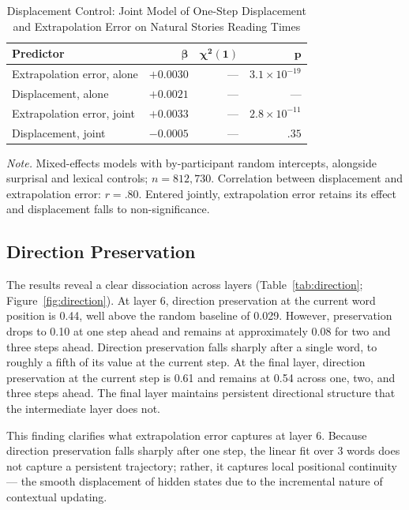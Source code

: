 \documentclass[12pt]{article}
\newcommand{\new}[1]{#1}   %
\begin{document}
\begin{table}[!htbp]
\centering
\caption{Displacement Control: Joint Model of One-Step Displacement and Extrapolation Error on Natural Stories Reading Times}
\label{tab:displacement}
\begin{tabular}{lrrr}
\toprule
\textbf{Predictor} & $\boldsymbol{\beta}$ & $\boldsymbol{\chi^2(1)}$ & $\boldsymbol{p}$ \\
\midrule
\new{Extrapolation error, alone} & \new{$+0.0030$} & \new{---} & \new{$3.1 \times 10^{-19}$} \\
\new{Displacement, alone} & \new{$+0.0021$} & \new{---} & \new{---} \\
\new{Extrapolation error, joint} & \new{$+0.0033$} & \new{---} & \new{$2.8 \times 10^{-11}$} \\
\new{Displacement, joint} & \new{$-0.0005$} & \new{---} & \new{$.35$} \\
\bottomrule
\end{tabular}

\smallskip
\footnotesize
\textit{Note.} \new{Mixed-effects models with by-participant random intercepts, alongside surprisal and lexical controls; $n = 812{,}730$. Correlation between displacement and extrapolation error: $r = .80$. Entered jointly, extrapolation error retains its effect and displacement falls to non-significance.}
\end{table}

\subsection{Direction Preservation}\label{sec:direction}

The results reveal a clear dissociation across layers (Table~\ref{tab:direction}; Figure~\ref{fig:direction}). At layer 6, direction preservation at the current word position is 0.44, well above the random baseline of 0.029. However, preservation drops to 0.10 at one step ahead and remains at approximately 0.08 for two and three steps ahead. \new{Direction preservation falls sharply after a single word, to roughly a fifth of its value at the current step.} At the final layer, direction preservation at the current step is 0.61 and remains at 0.54 across one, two, and three steps ahead. The final layer maintains persistent directional structure that the intermediate layer does not.

This finding clarifies what extrapolation error captures at layer 6. \new{Because direction preservation falls sharply after one step}, the linear fit over 3 words does not capture a persistent trajectory; rather, it captures local positional continuity --- the smooth displacement of hidden states due to the incremental nature of contextual updating.
\end{document}
